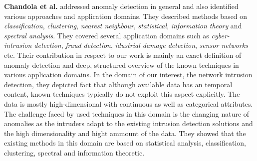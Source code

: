 \textbf{Chandola et al.} \cite{chandola2009anomaly} addressed anomaly detection in general and also identified various approaches and application domains.
They described methods based on \emph{classification}, \emph{clustering}, \emph{nearest neighbour}, 
\emph{statistical}, \emph{information theory} and \emph{spectral analysis}. 
They covered several application domains such as \emph{cyber-intrusion detection}, \emph{fraud detection}, 
\emph{idustrial damage detection}, \emph{sensor networks} etc. 
Their contribution in respect to our work is mainly an exact definition of anomaly detection and deep, 
structured overview of the known techniques in various application domains. In the domain of our interest, the network intrusion detection, 
they depicted fact that although available data has an temporal content, known techniques typically do not exploit this aspect explicitly. 
The data is mostly high-dimensional with continuous as well as categorical attributes. The challenge faced by used techniques in this domain is the changing nature of anomalies as the intruders adapt to the existing intrusion detection solutions and the high dimensionality and hight ammount of
the data. They showed that the existing methods in this domain are based on statistical analysis, classification, clustering, spectral and information theoretic.
%
